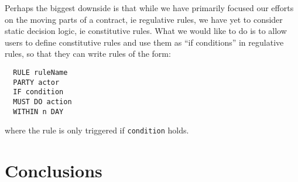 \documentclass{article}
\begin{document}
Perhaps the biggest downside is that while we have primarily focused our efforts
on the moving parts of a contract, ie regulative rules, we have yet to consider
static decision logic, ie constitutive rules.
What we would like to do is to allow users to define constitutive rules
and use them as ``if conditions'' in regulative rules, so that they can
write rules of the form:

\begin{lstlisting}
  RULE ruleName
  PARTY actor
  IF condition
  MUST DO action
  WITHIN n DAY
\end{lstlisting}

where the rule is only triggered if \texttt{condition} holds.

\section{Conclusions}

\newpage



\end{document}
